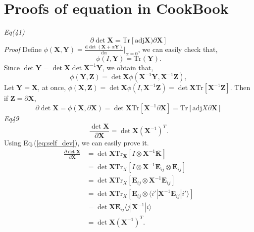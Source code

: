 \documentclass[a4paper,11pt]{article}
\def\tr{\mathrm{Tr}}
\def\m#1{\mathbf{#1}}
\def\adj{\mathrm{adj}}
\def\d{\mathrm{d}}
\begin{document}
\section{Proofs of equation in CookBook}
\emph{Eq(41)}
\begin{equation}
    \partial \det \m X = \tr[\adj \m X)\partial \m X]
\end{equation}
\emph{Proof}
Define $\phi(\m X,\m Y) = \frac{\d \det(\m X + \alpha \m Y)}{\d \alpha}|_{\alpha=0}$, we can easily check that,
\begin{equation}
    \phi(I, \m Y) = \tr(\m Y).
\end{equation}
Since $\det \m Y = \det \m X \det \m X^{-1} \m Y$, we obtain that,
\begin{equation}
    \phi(\m Y, \m Z) = \det \m X \phi(\m X^{-1} \m Y, \m X^{-1} \m Z),
\end{equation}
Let $\m Y = \m X$, at once, $\phi(\m X, \m Z) = \det \m X \phi(I, \m X^{-1} \m Z) = \det \m X \tr[\m X^{-1} \m Z]$. Then if $\m Z = \partial \m X$, 
\begin{equation}
    \partial \det \m X = \phi(\m X, \partial \m X) = \det \m X \tr[\m X^{-1} \partial \m X] = \tr[\adj X \partial \m X]
\end{equation}
\emph{Eq49}
\begin{equation}
    \frac{\det \m X}{\partial \m X} = \det \m X (\m X^{-1})^T.
\end{equation}
Using Eq.(\ref{eq:self_dev}), we can easily prove it.
\begin{align}
    \frac{\partial \det \m X}{\partial \m X} & = \det \m X \tr_{\m X}[I\otimes \m X^{-1} \bar{\m K}] \\
    & = \det\m X \tr_{X}[I \otimes \m X^{-1} \m E_{ij} \otimes \m E_{ij}] \\ 
    & = \det\m X \tr_{X}[\m E_{ij} \otimes \m X^{-1} \m E_{ij}] \\ 
    & = \det\m X \tr_{X}[\m E_{ij} \otimes \langle i'|\m X^{-1} \m E_{ij} | i'\rangle] \\
    & = \det\m X  \m E_{ij} \langle j| \m X^{-1} | i\rangle \\ 
    & = \det\m X  (\m X^{-1})^{T}.
\end{align}
\end{document}
